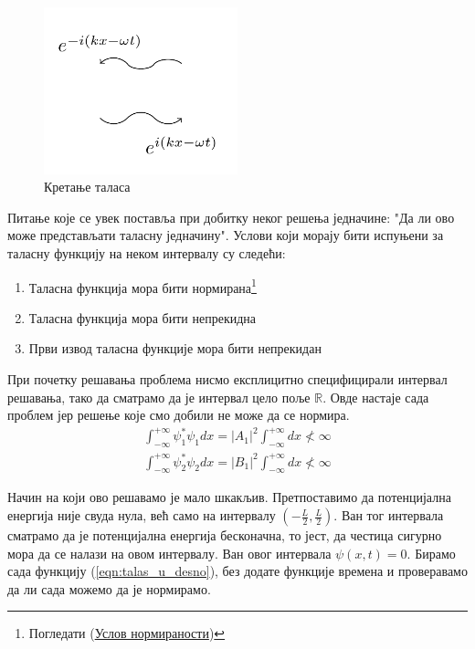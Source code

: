 \documentclass{tufte-handout} %
\theoremstyle{definition}
\theoremstyle{remark}
\newcommand{\R}{\mathbb{R}}
\begin{document}
\begin{figure}
	\centering
	\includegraphics[width=0.5\textwidth]{kretanje_talasa.png}
	\caption{Кретање таласа}
\end{figure}
Питање које се увек поставља при добитку неког решења једначине: "Да ли ово може представљати таласну једначину". Услови који морају бити испуњени за таласну функцију на неком интервалу су следећи:
\begin{enumerate}
	\item Таласна функција мора бити нормирана\footnote{Погледати (\hyperref[sec:uslov_normiranosti]{Услов нормираности})}
	\item Таласна функција мора бити непрекидна
	\item Први извод таласна функције мора бити непрекидан
\end{enumerate}
При почетку решавања проблема нисмо експлицитно специфицирали интервал решавања, тако да сматрамо да је интервал цело поље $\R$. Овде настаје сада проблем јер решење које смо добили не може да се нормира.
\begin{align}
	\int_{-\infty}^{+\infty}\psi_1^{\ast}\psi_1 dx = |A_1|^2\int_{-\infty}^{+\infty}dx\nless \infty\\ 
	\int_{-\infty}^{+\infty}\psi_2^{\ast}\psi_2 dx = |B_1|^2\int_{-\infty}^{+\infty}dx\nless \infty
\end{align}

Начин на који ово решавамо је мало шкакљив. Претпоставимо да потенцијална енергија није свуда нула, већ само на интервалу $(-\frac{L}{2},\frac{L}{2})$. Ван тог интервала сматрамо да је потенцијална енергија бесконачна, то јест, да честица сигурно мора да се налази на овом интервалу. Ван овог интервала $\psi(x,t)=0$. Бирамо сада функцију (\ref{eqn:talas_u_desno}), без додате функције времена и проверавамо да ли сада можемо да је нормирамо.
\end{document}
